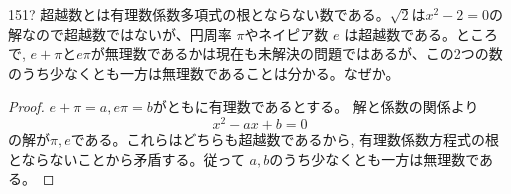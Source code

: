 \begin{prob}{151}{\hosi ?}{}
 超越数とは有理数係数多項式の根とならない数である。$\sqrt{2}$は$x^2-2=0$の解なので超越数ではないが、円周率 $\pi$やネイピア数 $e$ は超越数である。ところで, $e+\pi$と$e\pi$が無理数であるかは現在も未解決の問題ではあるが、この2つの数のうち少なくとも一方は無理数であることは分かる。なぜか。
\end{prob}
\begin{proof}
$e+\pi=a, e\pi =b$がともに有理数であるとする。 解と係数の関係より
\[x^2-ax+b=0\]
の解が$\pi ,e$である。これらはどちらも超越数であるから, 有理数係数方程式の根とならないことから矛盾する。従って $a,b$のうち少なくとも一方は無理数である。
\end{proof}
